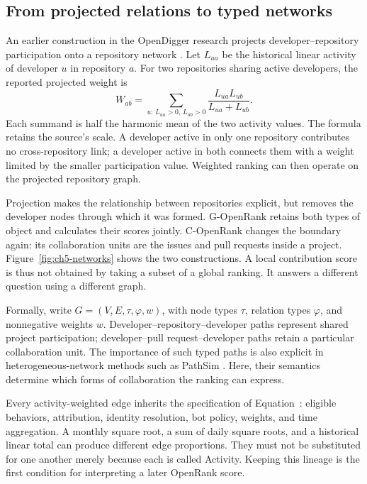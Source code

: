 \subsection{From projected relations to typed networks}
An earlier construction in the OpenDigger research projects developer--repository participation onto a repository network \citep[Section 3.5]{zhao2025thesis}. Let \(L_{ua}\) be the historical linear activity of developer \(u\) in repository \(a\). For two repositories sharing active developers, the reported projected weight is
\begin{equation}
 W_{ab}=\sum_{u:\,L_{ua}>0,\,L_{ub}>0}
 \frac{L_{ua}L_{ub}}{L_{ua}+L_{ub}}.
 \label{eq:ch5-projection}
\end{equation}
Each summand is half the harmonic mean of the two activity values. The formula retains the source's scale. A developer active in only one repository contributes no cross-repository link; a developer active in both connects them with a weight limited by the smaller participation value. Weighted ranking can then operate on the projected repository graph.

Projection makes the relationship between repositories explicit, but removes the developer nodes through which it was formed. G-OpenRank retains both types of object and calculates their scores jointly. C-OpenRank changes the boundary again: its collaboration units are the issues and pull requests inside a project. Figure~\ref{fig:ch5-networks} shows the two constructions. A local contribution score is thus not obtained by taking a subset of a global ranking. It answers a different question using a different graph.



Formally, write \(G=(V,E,\tau,\varphi,w)\), with node types \(\tau\), relation types \(\varphi\), and nonnegative weights \(w\). Developer--repository--developer paths represent shared project participation; developer--pull request--developer paths retain a particular collaboration unit. The importance of such typed paths is also explicit in heterogeneous-network methods such as PathSim \citep{sun2011}. Here, their semantics determine which forms of collaboration the ranking can express.

Every activity-weighted edge inherits the specification of Equation~: eligible behaviors, attribution, identity resolution, bot policy, weights, and time aggregation. A monthly square root, a sum of daily square roots, and a historical linear total can produce different edge proportions. They must not be substituted for one another merely because each is called Activity. Keeping this lineage is the first condition for interpreting a later OpenRank score.

